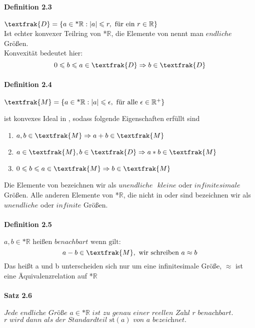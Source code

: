 \documentclass[a4paper]{article}
\begin{document}
\paragraph{Definition 2.3} $ \textfrak{D} = \{a \in \text{*}\mathbb{R}: |a| \leqslant r, \text{ für ein } r \in \mathbb{R}\} $ \\
Ist echter konvexer Teilring von *$\mathbb{R}$, die Elemente von  nennt man $ endliche $ Größen. \\
Konvexität bedeutet hier:
$$ 0 \leqslant b \leqslant a \in \textfrak{D} \Rightarrow b \in \textfrak{D} $$

\paragraph{Definition 2.4} $ \textfrak{M} = \{a \in \text{*}\mathbb{R}: |a| \leqslant \epsilon, \text{ für alle } \epsilon \in \mathbb{R}^+ \} $

\bigskip
{} ist konvexes Ideal in , sodass folgende Eigenschaften erfüllt sind 
\begin{enumerate}
      \item $a,b \in \textfrak{M} \Rightarrow a + b \in \textfrak{M} $ 
      \item $a \in \textfrak{M}, b \in \textfrak{D} \Rightarrow a * b \in \textfrak{M} $ 
      \item $0 \leqslant b \leqslant a \in \textfrak{M} \Rightarrow b \in \textfrak{M} $ 
\end{enumerate}
Die Elemente von  bezeichnen wir als $ unendliche \text{ } kleine $ oder $ infinitesimale $ Größen. 
Alle anderen Elemente von *$\mathbb{R}$, die nicht in  oder  sind bezeichnen wir als $ unendliche $ oder $ infinite $ Größen.

\paragraph{Definition 2.5} $a,b \in \text{*}\mathbb{R} \text{ heißen } benachbart \text{ wenn gilt:} $
$$ a - b \in \textfrak{M}, \text{ wir schreiben } a \approx b$$
Das heißt a und b unterscheiden sich nur um eine infinitesimale Größe, $\approx$ ist eine Äquivalenzrelation auf *$\mathbb{R}$

\paragraph{Satz 2.6} $ \textit{Jede endliche Größe } a \in \text{*}\mathbb{R} \textit{ ist zu genau einer reellen Zahl r benachbart.}$
$ \textit{r wird dann als der Standardteil } \text{st}(a) \textit{ von a bezeichnet.} $
\end{document}
